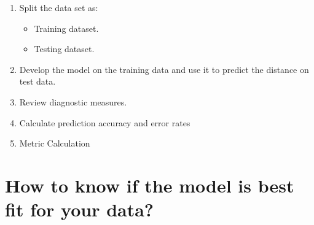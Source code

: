 \documentclass[a4paper,10pt]{article}
\begin{document}
\begin{enumerate}
	\item Split the data set as:
	\begin{itemize}
		\item Training dataset.
		\item Testing dataset.
	\end{itemize}
	\item Develop the model on the training data and use it to predict the distance on test data.
	\item Review diagnostic measures.
	\item Calculate prediction accuracy and error rates
	\item Metric Calculation
\end{enumerate}	

\section{How to know if the model is best fit for your data?}
\end{document}
